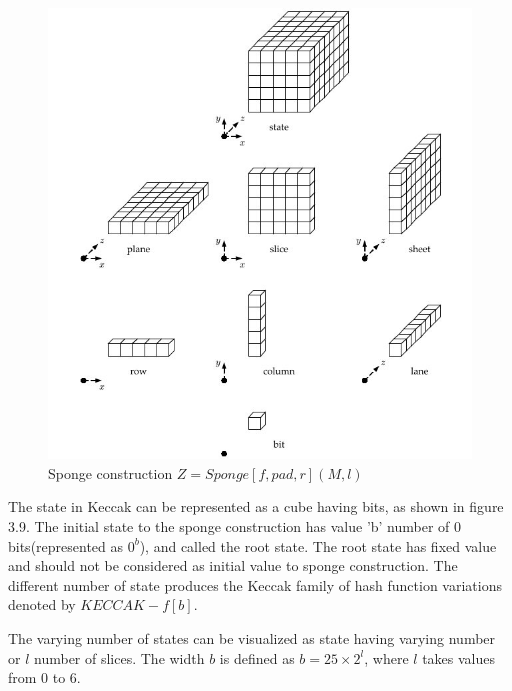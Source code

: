   \begin{figure}
    \begin{center}
      \includegraphics[width=6.5in]{keccakstateterminology.jpg}
    \end{center}
    \caption{Sponge construction $Z = Sponge[f, pad, r](M, l)$ \cite{00015}}
    \label{fig:lab}
  \end{figure}

  The state in Keccak can be represented as a cube having bits, as shown in figure 3.9. The initial state to the sponge
  construction has value 'b' number of 0 bits(represented as $0^{b}$), and called the root state. The root state has fixed
  value and should not be considered as initial value to sponge construction. The different number of state produces
  the Keccak family of hash function variations denoted by $KECCAK-f[b]$.
  
  The varying number of states can be visualized as state having varying number or $l$ number of slices. The width $b$ is
  defined as $b = 25 \times 2^{l}$, where $l$ takes values from 0 to 6.
  
